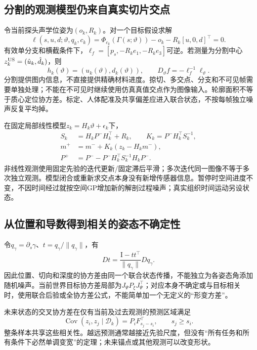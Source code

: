 \documentclass[UTF8,11pt,a4paper,fontset=fandol]{ctexart}
\numberwithin{equation}{section}
\theoremstyle{definition}
\DeclareMathOperator{\Cov}{Cov}
\newcommand{\Id}{\mathrm I}
\begin{document}
\subsection{分割的观测模型仍来自真实切片交点}
令当前探头声学位姿为$(o_k,R_k)$。对一个目标假设求解
\begin{equation}
 \ell(s,u,d;\vartheta,q_k,c_k)=
 \Phi_{c_k}(\Gamma(s;\vartheta))-o_k-R_k[u,0,d]^\top=0.
 \label{eq:obsloop}
\end{equation}
有效单分支和横截条件下，$\ell_f=[p_s,-R_ke_1,-R_ke_3]$可逆。若测量为分割中心$z_k^{\rm US}=(\hat u_k,\hat d_k)$，则
\begin{equation}
 h_k(\vartheta)=(u_k(\vartheta),d_k(\vartheta)),\qquad
 D_\vartheta f=-\ell_f^{-1}\ell_\vartheta.
 \label{eq:likelihood}
\end{equation}
分割提供图内信息，不直接提供精确材料进度。掠切、多交点、分支和不可见帧需要单独处理；不能在不可见时继续使用仿真真值交点作为图像输入。轮廓面积不等于质心定位协方差。标定、人体配准及共享偏差应进入联合状态，不按每帧独立噪声反复平均掉。

在固定局部线性模型$z_k=H_k\vartheta+\epsilon_k$下，
\begin{align}
 S_k&=H_kP^-H_k^\top+R_k,\qquad K_k=P^-H_k^\top S_k^{-1},\\
 m^+&=m^-+K_k(z_k-H_km^-),\\
 P^+&=P^--P^-H_k^\top S_k^{-1}H_kP^-.
 \label{eq:update}
\end{align}
非线性观测使用固定先验的迭代更新/固定滞后平滑；多次迭代同一图像不等于多次独立观测。模型闭合或重新求交点本身没有新增传感器信息。暂停时空间进度不变，不因时间经过就按空间GP增加新的解剖过程噪声；真实组织时间运动另设状态。

\subsection{从位置和导数得到相关的姿态不确定性}
令$q_\gamma=\partial_s\gamma$、$t=q_\gamma/\|q_\gamma\|$，有
\begin{equation}
 D t=\frac{\Id-tt^\top}{\|q_\gamma\|}Dq_\gamma.
\end{equation}
因此位置、切向和深度的协方差由同一个联合状态传播，不能独立为各姿态角添加随机噪声。当前世界目标协方差局部为$J_\Psi P_\xi J_\Psi^\top$；对应本身不确定或与目标相关时，使用联合后验或全协方差公式，不能简单加一个无定义的“形变方差”。

未来状态的交叉协方差在仅有当前及过去观测的预测区域满足
\begin{equation}
 \Cov(z_i,z_j\mid\mathcal D_k)=P_iF_{s_j-s_i}^\top,\qquad s_j\ge s_i.
 \label{eq:crosscov}
\end{equation}
整条样本共享这些相关性。越远预测通常越接近先验尺度，但没有“所有任务和所有条件下必然单调变宽”的定理；未来锚点或其他观测可以改变形状。
\end{document}
